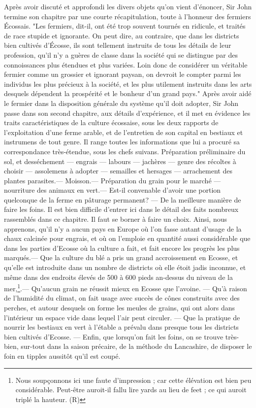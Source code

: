 Après avoir discuté et approfondi les divers objets qu'on vient d'énoncer, Sir John\setcounter{page}{420} termine son chapitre par une courte récapitulation, toute à l'honneur des fermiers Écossais.
"Les fermiers, dit-il, ont été trop souvent tournés en ridicule, et traités de race stupide et ignorante. On peut dire, au contraire, que dans les districts bien cultivés d'Écosse, ils sont tellement instruits de tous les détails de leur profession, qu'il n'y a guères de classe dans la société qui se distingue par des connoissances plus étendues et plus variées. Loin donc de considérer un véritable fermier comme un grossier et ignorant paysan, on devroit le compter parmi les individus les plus précieux à la société, et les plus utilement instruits dans les arts desquels dépendent la prospérité et le bonheur d'un grand pays."
Après avoir aidé le fermier dans la disposition générale du système qu'il doit adopter, Sir John passe dans son second chapitre, aux détails d'expérience, et il met en évidence les traits caractéristiques de la culture écossaise, sous les deux rapports de l'exploitation d'une ferme arable, et de l'entretien de son capital en bestiaux et instrumens de tout genre. Il range toutes les informations que lui a procuré sa correspondance très-étendue, sous les chefs suivans.
\setcounter{page}{421} Préparation préliminaire du sol, et desséchement — engrais — labours — jachères — genre des récoltes à choisir — assolemens à adopter — semailles et hersages — arrachement des plantes parasites.— Moisson.— Préparation du grain pour le marché — nourriture des animaux en vert.— Est-il convenable d'avoir une portion quelconque de la ferme en pâturage permanent? — De la meilleure manière de faire les foins.
Il est bien difficile d'entrer ici dans le détail des faits nombreux rassemblés dans ce chapitre. Il faut se borner à faire un choix. Ainsi, nous apprenons, qu'il n'y a aucun pays en Europe où l'on fasse autant d'usage de la chaux calcinée pour engrais, et où on l'emploie en quantité aussi considérable que dans les parties d'Ecosse où la culture a fait, et fait encore les progrès les plus marqués.— Que la culture du blé a pris un grand accroissement en Ecosse, et qu'elle est introduite dans un nombre de districts où elle étoit jadis inconnue, et même dans des endroits élevés de 500 à 600 pieds an-dessus du niveau de la mer,\footnote{Nous soupçonnons ici une faute d'impression ; car cette élévation est bien peu considérable. Peut-être auroit-il fallu lire yards au lieu de feet ; ce qui auroit triplé la hauteur. (R)}.— Qu'aucun grain ne\setcounter{page}{422} réussit mieux en Ecosse que l'avoine. — Qu'à raison de l'humidité du climat, on fait usage avec succès de cônes construits avec des perches, et autour desquels on forme les meules de grains, qui ont alors dans l'intérieur un espace vide dans lequel l'air peut circuler. — Que la pratique de nourrir les bestiaux en vert à l'étable a prévalu dans presque tous les districts bien cultivés d'Ecosse. — Enfin, que lorsqu'on fait les foins, on se trouve très-bien, sur-tout dans la saison précaire, de la méthode du Lancashire, de disposer le foin en tipples aussitôt qu'il est coupé.
